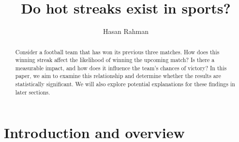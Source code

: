 \documentclass{article}
\title{Do hot streaks exist in sports?}
\author{Hasan Rahman}
\date{ }
\begin{document}
\maketitle
\begin{abstract}
Consider a football team that has won its previous three matches. How does this winning streak affect the likelihood of winning the upcoming match? Is there a measurable impact, and how does it influence the team’s chances of victory? In this paper, we aim to examine this relationship and determine whether the results are statistically significant. We will also explore potential explanations for these findings in later sections.
\newline
\end{abstract}
\tableofcontents
\newpage
\section{Introduction and overview}
\end{document}
